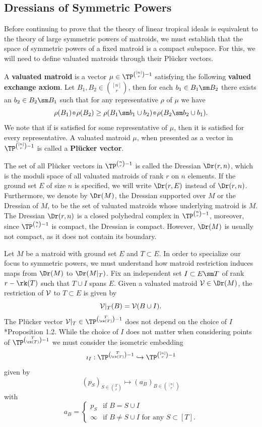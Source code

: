\subsection{Dressians of Symmetric Powers}\label{subsec:SpacesofSymPow}
Before continuing to prove that the theory of linear tropical ideals is equivalent to the theory of large symmetric powers of matroids, we must establish that the space of symmetric powers of a fixed matroid is a compact subspace. For this, we will need to define valuated matroids through their Pl\"ucker vectors.

\begin{definition}\label{def:valuatedMatroid}
   A \textbf{valuated matroid} is a vector $\mu\in \TP^{\binom{[n]}{r}-1}$ satisfying the following \textbf{valued exchange axiom}. Let $B_1,B_2\in \binom{[n]}{r}$, then for each $b_1\in B_1\sm B_2$ there exists an $b_2\in B_2\sm B_1$ such that for any representative $\rho$ of $\mu$ we have
        \begin{equation}\label{eqn:basisExchange}
                \rho(B_1)\ttimes\rho(B_2)\geq \rho(B_1\sm b_1\cup b_2)\ttimes\rho(B_2\sm b_2\cup b_1).
        \end{equation}
    We note that if  is satisfied for some representative of $\mu$, then it is satisfied for every representative. A valuated matroid $\mu$, when presented as a vector in $\TP^{\binom{[n]}{r}-1}$ is called a \textbf{Pl\"ucker vector}.
    \end{definition}
The set of all Pl\"ucker vectors in $\TP^{\binom{n}{r}-1}$ is called the Dressian $\Dr(r,n)$, which is the moduli space of all valuated matroids of rank $r$ on $n$ elements. If the ground set $E$ of size $n$ is specified, we will write $\Dr(r,E)$ instead of $\Dr(r,n)$. Furthermore, we denote by $\Dr(M)$, the Dressian supported over $M$ or the Dressian of $M$, to be the set of valuated matroids whose underlying matroid is $M$. The Dressian $\Dr(r,n)$ is a closed polyhedral complex in $\TP^{\binom{n}{r}-1}$, moreover, since $\TP^{\binom{n}{r}-1}$ is compact, the Dressian is compact. However, $\Dr(M)$ is usually not compact, as it does not contain its boundary.

Let $M$ be a matroid with ground set $E$ and $T\subset E$. In order to specialize our focus to symmetric powers, we must understand how matroid restriction induces maps from $\Dr(M)$ to $\Dr(M|_T)$. Fix an independent set $I\subset E\sm T$ of rank $r-\rk(T)$ such that $T\cup I$ spans $E$. Given a valuated matroid $\sV\in \Dr(M)$, the restriction of $\mathcal{V}$ to $T\subset E$ is given by
$$\mathcal{V}|_T(B) = \mathcal{V}(B\cup I).$$
The Pl\"ucker vector $\sV|_T\in \TP^{\binom{T}{\rk(T)}-1}$ does not depend on the choice of $I$ \cite{DW92}*{Proposition 1.2}. While the choice of $I$ does not matter when considering points of $\TP^{\binom{T}{\rk(T)}-1}$ we must consider the isometric embedding 
$$\imath_I:\TP^{\binom{T}{\rk(T)}-1}\hookrightarrow\TP^{\binom{[n]}{r}-1}$$ 
given by
 $$ (p_S)_{S\in\binom{T}{r}}\mapsto (a_B)_{B\in \binom{[n]}{r}} $$
 with
 $$a_B = \begin{cases}
 p_S & \text{if } B=S\cup I\\
 \infty & \text{if } B\neq S\cup I \text{ for any } S\subset [T].
 \end{cases}$$

